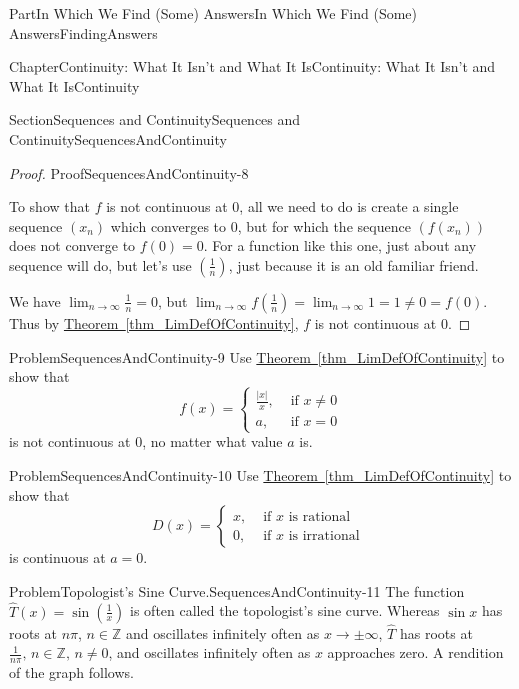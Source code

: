 \documentclass[oneside,10pt,]{book}
\newcommand{\xreffont}{\relax}
\numberwithin{equation}{part}
\newcommand{\abs}[1]{\left|#1\right|}
\def\limit#1#2#3{{\displaystyle\lim_{#1\rightarrow #2}#3}}
\newcommand{\ZZ}{\mathbb {Z}}
\newcommand{\amp}{&}
\begin{document}
\begin{partptx}{Part}{In Which We Find (Some) Answers}{}{In Which We Find (Some) Answers}{}{}{FindingAnswers}
\begin{chapterptx}{Chapter}{Continuity: What It Isn't and What It Is}{}{Continuity: What It Isn't and What It Is}{}{}{Continuity}
\begin{sectionptx}{Section}{Sequences and Continuity}{}{Sequences and Continuity}{}{}{SequencesAndContinuity}
\begin{proof}{Proof}{}{SequencesAndContinuity-8}
\begin{equation*}
\end{equation*}
%
\par
To show that \(f\) is not continuous at \(0\), all we need to do is create a single sequence \(\left(x_n\right)\) which converges to \(0\), but for which the sequence \(\left(f\left(x_n\right)\right)\) does not converge to \(f(0)=0\).  For a function like this one, just about any sequence will do, but let's use \(\left(\frac{1}{n}\right)\), just because it is an old familiar friend.%
\par
We have \(\limit{n}{\infty}{\frac{1}{n}}=0\), but \(\limit{n}{\infty}{f\left(\frac{1}{n}\right)}=\limit{n}{
\infty}{1}=1\neq 0=f(0)\).  Thus by \hyperref[thm_LimDefOfContinuity]{Theorem~{\xreffont\ref{thm_LimDefOfContinuity}}}, \(f\) is not continuous at \(0\).%
\end{proof}
\begin{problem}{Problem}{}{SequencesAndContinuity-9}%
Use \hyperref[thm_LimDefOfContinuity]{Theorem~{\xreffont\ref{thm_LimDefOfContinuity}}} to show that%
\begin{equation*}
f(x)= \begin{cases}
\frac{\abs{x}}{x},\amp \text{ if } x\neq 0\\
a, \amp \text{ if } x=0 \end{cases}  
\end{equation*}
is not continuous at \(0\), no matter what value \(a\) is.%
\end{problem}
\begin{problem}{Problem}{}{SequencesAndContinuity-10}%
Use \hyperref[thm_LimDefOfContinuity]{Theorem~{\xreffont\ref{thm_LimDefOfContinuity}}} to show that%
\begin{equation*}
D(x)= \begin{cases}
x, \amp \text{ if } x\text{ is rational } \\
0, \amp \text{ if } x\text{ is irrational } \end{cases}  
\end{equation*}
is  continuous at \(a= 0\).%
\end{problem}
\begin{problem}{Problem}{Topologist's Sine Curve.}{SequencesAndContinuity-11}%
The function \(\hat{T}(x)=\sin\left(\frac{1}{x}\right)\) is often called the topologist's sine curve.  Whereas \(\sin
x\) has roots at \(n\pi\), \(n\in\ZZ\) and oscillates infinitely often as \(x\rightarrow\pm\infty\), \(\hat{T}\) has roots at \(\frac{1}{n\pi},\,n\in\ZZ,\,n\neq
0\), and oscillates infinitely often as \(x\) approaches zero.  A rendition of the graph follows.%

\end{problem}
\end{sectionptx}
\end{chapterptx}
\end{partptx}
\end{document}
